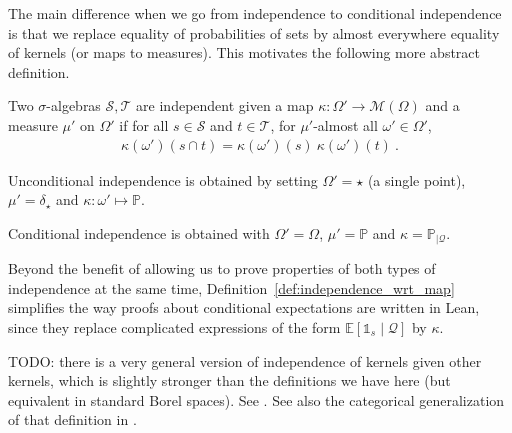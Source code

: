 The main difference when we go from independence to conditional independence is that we replace equality of probabilities of sets by almost everywhere equality of kernels (or maps to measures). This motivates the following more abstract definition.

\begin{definition}\label{def:independence_wrt_map}
Two $\sigma$-algebras $\mathcal S, \mathcal T$ are independent given a map $\kappa : \Omega' \to \mathcal M(\Omega)$ and a measure $\mu'$ on $\Omega'$ if for all $s \in \mathcal S$ and $t \in \mathcal T$, for $\mu'$-almost all $\omega' \in \Omega'$,
\begin{align*}
\kappa (\omega') (s \cap t) = \kappa (\omega') (s) \: \kappa (\omega') (t)
\: .
\end{align*}
\end{definition}

Unconditional independence is obtained by setting $\Omega' = \star$ (a single point), $\mu' = \delta_\star$ and $\kappa : \omega' \mapsto \mathbb{P}$.

Conditional independence is obtained with $\Omega' = \Omega$, $\mu' = \mathbb{P}$ and $\kappa = \mathbb{P}_{| \mathcal Q}$.

Beyond the benefit of allowing us to prove properties of both types of independence at the same time, Definition~\ref{def:independence_wrt_map} simplifies the way proofs about conditional expectations are written in Lean, since they replace complicated expressions of the form $\mathbb{E}[\mathbb{1}_{s} \mid \mathcal Q]$ by $\kappa$.

TODO: there is a very general version of independence of kernels given other kernels, which is slightly stronger than the definitions we have here (but equivalent in standard Borel spaces). See \cite{forre2021transitional}.
See also the categorical generalization of that definition in \cite{fritz2023d}.